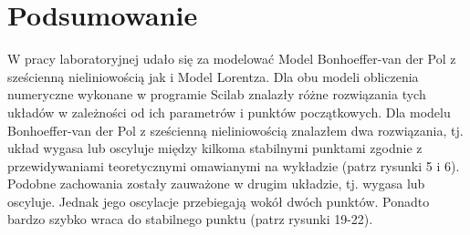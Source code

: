 \documentclass[12pt]{article}
\begin{document}
\section{Podsumowanie}
W pracy laboratoryjnej udało się za modelować Model Bonhoeffer-van der Pol z sześcienną nieliniowością jak i Model Lorentza. Dla obu modeli obliczenia numeryczne wykonane w programie Scilab znalazły różne rozwiązania tych układów w zależności od ich parametrów i punktów początkowych. Dla modelu Bonhoeffer-van der Pol z sześcienną nieliniowością znalazłem dwa rozwiązania, tj. układ wygasa lub oscyluje między kilkoma stabilnymi punktami zgodnie z przewidywaniami teoretycznymi omawianymi na wykładzie (patrz rysunki 5 i 6). Podobne zachowania zostały zauważone w drugim układzie, tj. wygasa lub oscyluje. Jednak jego oscylacje przebiegają wokół dwóch punktów. Ponadto bardzo szybko wraca do stabilnego punktu (patrz rysunki 19-22).
\end{document}
